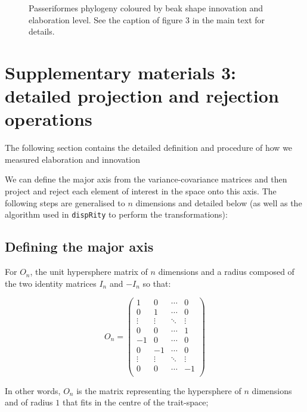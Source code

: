 \documentclass[12pt,letterpaper]{article}
\begin{document}
\begin{figure}[!htbp]
\centering
\caption{Passeriformes phylogeny coloured by beak shape innovation and elaboration level. See the caption of figure 3 in the main text for details.}
\label{fig_phylogeny_passeriformes}
\end{figure}

\newpage

\section{Supplementary materials 3: detailed projection and rejection operations}

The following section contains the detailed definition and procedure of how we measured elaboration and innovation

We can define the major axis from the variance-covariance matrices and then project and reject each element of interest in the space onto this axis.
The following steps are generalised to $n$ dimensions and detailed below (as well as the algorithm used in \texttt{dispRity} \cite{dispRity} to perform the transformations):

\subsection{Defining the major axis}

For $O_{n}$, the unit hypersphere matrix of $n$ dimensions and a radius composed of the two identity matrices $I_{n}$ and $-I_{n}$ so that: 

\begin{equation}
O_{n} = 
    \begin{pmatrix}
        1 & 0 & \cdots & 0 \\
        0 & 1 & \cdots & 0 \\
        \vdots  & \vdots  & \ddots & \vdots  \\
        0 & 0 & \cdots & 1 \\
        -1 & 0 & \cdots & 0 \\
        0 & -1 & \cdots & 0 \\
        \vdots  & \vdots  & \ddots & \vdots  \\
        0 & 0 & \cdots & -1 \\
    \end{pmatrix}
\end{equation}

In other words, $O_{n}$ is the matrix representing the hypersphere of $n$ dimensions and of radius $1$ that fits in the centre of the trait-space;
\end{document}
